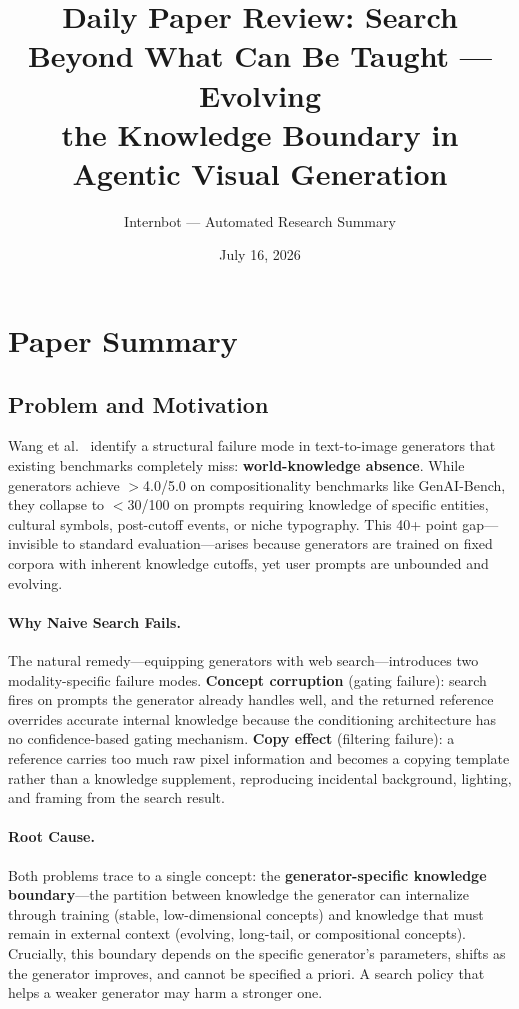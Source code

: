 \documentclass[11pt,a4paper]{article}
\title{Daily Paper Review: Search Beyond What Can Be Taught --- Evolving\\the Knowledge Boundary in Agentic Visual Generation}
\author{Internbot --- Automated Research Summary}
\date{July 16, 2026}
\begin{document}
\maketitle

\section{Paper Summary}

\subsection{Problem and Motivation}

Wang et al.~\cite{wang2026searchgen} identify a structural failure mode in text-to-image generators that existing benchmarks completely miss: \textbf{world-knowledge absence}. While generators achieve $>$4.0/5.0 on compositionality benchmarks like GenAI-Bench, they collapse to $<$30/100 on prompts requiring knowledge of specific entities, cultural symbols, post-cutoff events, or niche typography. This 40+ point gap---invisible to standard evaluation---arises because generators are trained on fixed corpora with inherent knowledge cutoffs, yet user prompts are unbounded and evolving.

\paragraph{Why Naive Search Fails.} The natural remedy---equipping generators with web search---introduces two modality-specific failure modes. \textbf{Concept corruption} (gating failure): search fires on prompts the generator already handles well, and the returned reference overrides accurate internal knowledge because the conditioning architecture has no confidence-based gating mechanism. \textbf{Copy effect} (filtering failure): a reference carries too much raw pixel information and becomes a copying template rather than a knowledge supplement, reproducing incidental background, lighting, and framing from the search result.

\paragraph{Root Cause.} Both problems trace to a single concept: the \textbf{generator-specific knowledge boundary}---the partition between knowledge the generator can internalize through training (stable, low-dimensional concepts) and knowledge that must remain in external context (evolving, long-tail, or compositional concepts). Crucially, this boundary depends on the specific generator's parameters, shifts as the generator improves, and cannot be specified a priori. A search policy that helps a weaker generator may harm a stronger one.
\end{document}
